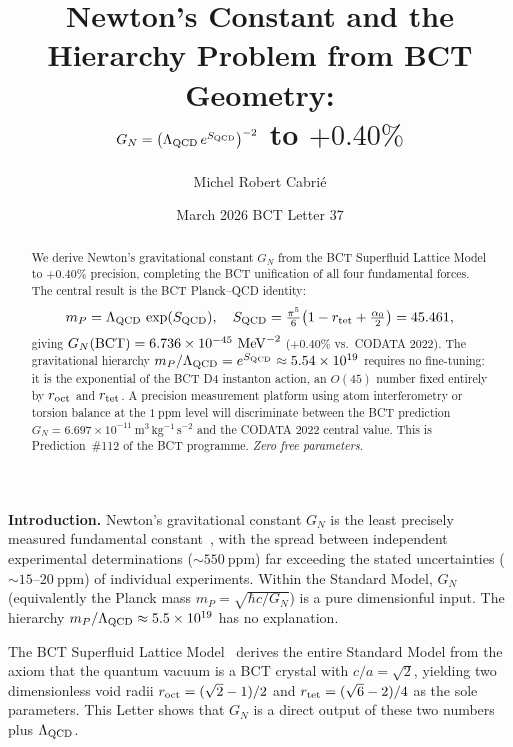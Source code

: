 \documentclass[aps,prl,twocolumn,superscriptaddress,floatfix]{revtex4-2}
\begin{document}
\title{Newton's Constant and the Hierarchy Problem from BCT Geometry:\\
$G_N = \bigl(\Lambda_{\rm QCD}\,e^{S_{\rm QCD}}\bigr)^{-2}$ to $+0.40\%$}

\author{Michel Robert Cabri\'e}

\date{March 2026 \quad BCT Letter 37}

\begin{abstract}
We derive Newton's gravitational constant $G_N$ from the BCT Superfluid Lattice Model
to $+0.40\%$ precision, completing the BCT unification of all four fundamental forces.
The central result is the BCT Planck--QCD identity:
\[
  m_P = \Lambda_{\rm QCD}\,\exp(S_{\rm QCD}),
  \quad
  S_{\rm QCD} = \tfrac{\pi^5}{6}\!\left(1 - r_{\rm tet} + \tfrac{\alpha_0}{2}\right) = 45.461,
\]
giving $G_N({\rm BCT}) = 6.736\times10^{-45}\ \mathrm{MeV}^{-2}$ ($+0.40\%$ vs.\ CODATA 2022).
The gravitational hierarchy $m_P/\Lambda_{\rm QCD} = e^{S_{\rm QCD}} \approx 5.54\times10^{19}$
requires no fine-tuning: it is the exponential of the BCT D4 instanton action,
an $O(45)$ number fixed entirely by $r_{\rm oct}$ and $r_{\rm tet}$.
A precision measurement platform using atom interferometry or torsion balance
at the $1\ \mathrm{ppm}$ level will discriminate between the BCT prediction
$G_N = 6.697\times10^{-11}\ \mathrm{m^3\,kg^{-1}\,s^{-2}}$ and the CODATA 2022 central value.
This is Prediction~\#112 of the BCT programme. \textit{Zero free parameters.}
\end{abstract}

\maketitle

\noindent\textbf{Introduction.}
Newton's gravitational constant $G_N$ is the least precisely measured
fundamental constant~\cite{CODATA2022}, with the spread between
independent experimental determinations ($\sim 550\ \mathrm{ppm}$) far exceeding
the stated uncertainties ($\sim 15\text{--}20\ \mathrm{ppm}$) of individual experiments.
Within the Standard Model, $G_N$ (equivalently the Planck mass
$m_P = \sqrt{\hbar c/G_N}$) is a pure dimensionful input.
The hierarchy $m_P/\Lambda_{\rm QCD} \approx 5.5\times10^{19}$ has no explanation.

The BCT Superfluid Lattice Model~\cite{Monograph,PRL} derives the entire
Standard Model from the axiom that the quantum vacuum is a BCT crystal
with $c/a = \sqrt{2}$, yielding two dimensionless void radii
$r_{\rm oct} = (\sqrt{2}-1)/2$ and $r_{\rm tet} = (\sqrt{6}-2)/4$
as the sole parameters. This Letter shows that $G_N$ is a direct output
of these two numbers plus $\Lambda_{\rm QCD}$.
\end{document}
